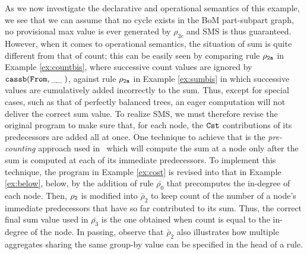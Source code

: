 \documentclass[11pt]{article}
\def\f--{\tt{ \_\!\_\;}}
\begin{document}
As we now investigate the declarative and operational semantics of this example, we see that 
we  can assume that no cycle exists in the BoM part-subpart graph,
no provisional max value is ever generated by $\rho_{2c}$  and SMS is thus guaranteed.
However, when it comes to operational semantics, the situation of sum is quite different from 
that of count;  this can be easily seen by comparing 
rule $\tt \rho_{2a}$ in Example \ref{ex:countbis}, where successive  count values are ignored by $\tt cassb(From, \f--)$, against
rule $\tt \rho_{2a}$ in Example \ref{ex:sumbis} in which successive values are cumulatively added  incorrectly to the sum.
Thus, except for
special cases, such as that of perfectly balanced trees, an eager computation
will not deliver the correct  sum value.
To  realize SMS, we must therefore revise the original program to 
 make sure that, for each node,  the $\tt Cst$ contributions of 
its predecessors are added all at once. 
 One technique to achieve that is  the  {\it pre-counting} approach used in~\cite{datalogml}
 which will compute the sum at a node only after the sum is computed at each of
 its immediate predecessors.
To implement this technique, the program in Example \ref{ex:cost} is  revised
into that in Example \ref{ex:below}, below,  by  the addition of
rule $\bar{\rho_0}$ 
that precomputes the in-degree of each node. Then, 
$\tt \rho_2$  is modified into $\bar{\rho}_2$
to keep count of the number of a node's immediate predecessors that have so far  contributed to its sum. 
Thus, the correct final  sum value used in $\bar{\rho_3}$ is the one obtained when  count is  equal to the in-degree of the node.
In passing, observe that  $\bar{\rho}_2$  also illustrates  how multiple aggregates sharing the
same group-by value can be specified in the head of a rule.\\[-0.5cm]
\end{document}
